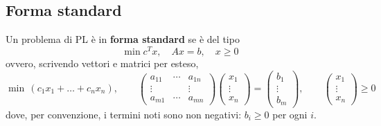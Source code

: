 \subsection{Forma standard}
\begin{definizione}\label{def:standard}
Un problema di PL è in \textbf{forma standard} se è del tipo
\[
\min c^T x, \quad A x = b, \quad x \ge 0
\]
ovvero, scrivendo vettori e matrici per esteso,
\[
\min\, (c_1 x_1 + \dots + c_n x_n), \qquad
\begin{pmatrix} a_{11} & \cdots & a_{1n} \\ \vdots & & \vdots \\ a_{m1} & \cdots & a_{mn} \end{pmatrix}
\begin{pmatrix} x_1 \\ \vdots \\ x_n \end{pmatrix} =
\begin{pmatrix} b_1 \\ \vdots \\ b_m \end{pmatrix}, \qquad
\begin{pmatrix} x_1 \\ \vdots \\ x_n \end{pmatrix} \ge 0
\]
dove, per convenzione, i termini noti sono non negativi: $b_i \ge 0$ per ogni $i$.
\end{definizione}

